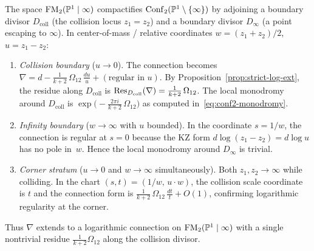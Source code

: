 \begin{computation}
\label{comp:log-extension-fm2}
The space $\mathrm{FM}_2(\mathbb P^1\mid\infty)$ compactifies $\mathrm{Conf}_2(\mathbb P^1\setminus\{\infty\})$
by adjoining a boundary divisor $D_{\mathrm{coll}}$ (the collision locus $z_1=z_2$)
and a boundary divisor $D_\infty$ (a point escaping to $\infty$).
In center-of-mass / relative coordinates $w=(z_1+z_2)/2$, $u=z_1-z_2$:
\begin{enumerate}[label=\textup{(\alph*)}]
\item \emph{Collision boundary} ($u\to 0$).
 The connection becomes
 $\nabla = d - \frac{1}{k+2}\,\Omega_{12}\,\frac{du}{u} + (\text{regular in } u)$.
 By Proposition~\ref{prop:strict-log-ext}, the residue along $D_{\mathrm{coll}}$
 is $\mathrm{Res}_{D_{\mathrm{coll}}}(\nabla)=\frac{1}{k+2}\,\Omega_{12}$.
 The local monodromy around $D_{\mathrm{coll}}$ is
 $\exp\!\bigl(-\frac{2\pi i}{k+2}\,\Omega_{12}\bigr)$ as computed in~\eqref{eq:conf2-monodromy}.
\item \emph{Infinity boundary} ($w\to\infty$ with $u$ bounded).
 In the coordinate $s=1/w$, the connection is regular at $s=0$
 because the KZ form $d\log(z_1-z_2)=d\log u$ has no pole in~$w$.
 Hence the local monodromy around $D_\infty$ is trivial.
\item \emph{Corner stratum} ($u\to 0$ and $w\to\infty$ simultaneously).
 Both $z_1,z_2\to\infty$ while colliding.
 In the chart $(s,t)=(1/w,\,u\cdot w)$, the collision scale coordinate
 is $t$ and the connection form is
 $\frac{1}{k+2}\,\Omega_{12}\,\frac{dt}{t}+O(1)$,
 confirming logarithmic regularity at the corner.
\end{enumerate}
Thus $\nabla$ extends to a logarithmic connection on $\mathrm{FM}_2(\mathbb P^1\mid\infty)$
with a single nontrivial residue $\frac{1}{k+2}\Omega_{12}$
along the collision divisor.
\end{computation}

